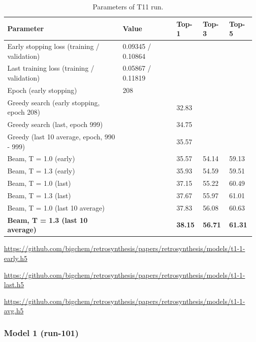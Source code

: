 \documentclass{article}
\begin{document}
\begin{table}[h!]
\caption{Parameters of T11 run.}
  \centering
  \begin{tabular}{p{6.2cm}p{3.5cm}p{1.5cm}p{1.5cm}p{1.5cm}}
    \toprule
    Parameter & Value & Top-1 & Top-3 & Top-5 \\
    \midrule
    Early stopping loss (training / validation) &  0.09345 / 0.10864 & & & \\
    Last training loss (training / validation) &  0.05867 / 0.11819& & & \\
    Epoch (early stopping) & 208 & & & \\
    \midrule
    Greedy search (early stopping, epoch 208) & & 32.83 & &\\
    Greedy search (last, epoch 999) & & 34.75 & & \\
    Greedy (last 10 average, epoch, 990 - 999) & & 35.57 & & \\
    \midrule
    Beam, T = 1.0 (early) & & 35.57 & 54.14 & 59.13 \\
    Beam, T = 1.3 (early) & & 35.93 & 54.59 & 59.51 \\ 
    \midrule
    Beam, T = 1.0 (last) & & 37.15 & 55.22 &  60.49 \\
    Beam, T = 1.3 (last) & & 37.67 & 55.97 & 61.01 \\ 
    \midrule
    Beam, T = 1.0 (last 10 average) & & 37.83 & 56.08 &  60.63 \\
    \textbf{Beam, T = 1.3 (last 10 average)}  & & \textbf{38.15} & \textbf{56.71} & \textbf{61.31} \\ 
    \bottomrule
  \end{tabular}
  \label{tbl:t11}

\end{table} 


\url{https://github.com/bigchem/retrosynthesis/papers/retrosynthesis/models/t1-1-early.h5}

\url{https://github.com/bigchem/retrosynthesis/papers/retrosynthesis/models/t1-1-last.h5}

\url{https://github.com/bigchem/retrosynthesis/papers/retrosynthesis/models/t1-1-avg.h5}


\newpage

\subsubsection{Model 1 (run-101)}
  
\end{document}
